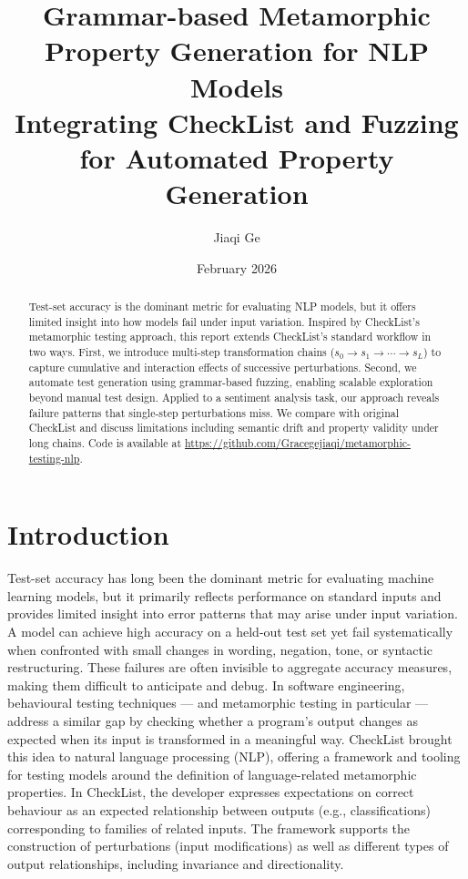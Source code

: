 \documentclass[11pt]{article}
\title{
\textbf{Grammar-based Metamorphic Property Generation for NLP Models}\\[6pt]
\large Integrating CheckList and Fuzzing for Automated Property Generation 
}
\author{Jiaqi Ge}
\date{February 2026}
\begin{document}
\maketitle

\begin{abstract}
Test-set accuracy is the dominant metric for evaluating NLP models, but it offers limited insight into how models fail under input variation. Inspired by CheckList's metamorphic testing approach, this report extends CheckList's standard workflow in two ways. First, we introduce multi-step transformation chains ($s_0 \rightarrow s_1 \rightarrow \cdots \rightarrow s_L$) to capture cumulative and interaction effects of successive perturbations. Second, we automate test generation using grammar-based fuzzing, enabling scalable exploration beyond manual test design. Applied to a sentiment analysis task, our approach reveals failure patterns that single-step perturbations miss. We compare with original CheckList and discuss limitations including semantic drift and property validity under long chains.
Code is available at \url{https://github.com/Gracegejiaqi/metamorphic-testing-nlp}.
\end{abstract}

\newpage

\tableofcontents
\newpage

\section{Introduction}

Test-set accuracy has long been the dominant metric for evaluating machine learning models, but it primarily reflects performance on standard inputs and provides limited insight into error patterns that may arise under input variation. A model can achieve high accuracy on a held-out test set yet fail systematically when confronted with small changes in wording, negation, tone, or syntactic restructuring. These failures are often invisible to aggregate accuracy measures, making them difficult to anticipate and debug. In software engineering, behavioural testing techniques — and metamorphic testing in particular — address a similar gap by checking whether a program's output changes as expected when its input is transformed in a meaningful way. CheckList brought this idea to natural language processing (NLP), offering a framework and tooling for testing models around the definition of language-related metamorphic properties. In CheckList, the developer expresses expectations on correct behaviour as an expected relationship between outputs (e.g., classifications) corresponding to families of related inputs. The framework supports the construction of perturbations (input modifications) as well as different types of output relationships, including invariance and directionality.
\end{document}
